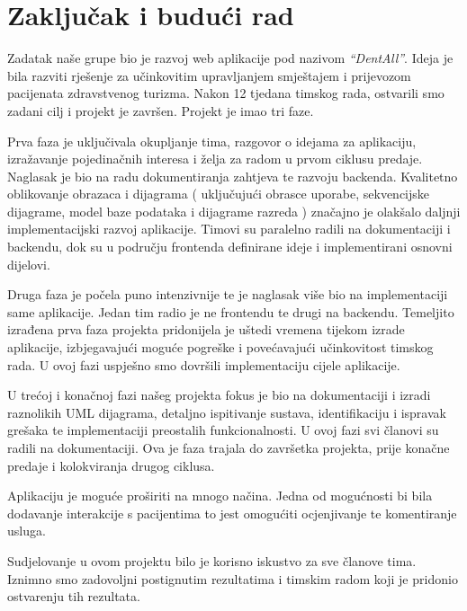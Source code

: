 \chapter{Zaključak i budući rad}
		
		 Zadatak naše grupe bio je razvoj web aplikacije pod nazivom \textit{ “DentAll”}. Ideja je bila razviti rješenje za učinkovitim upravljanjem smještajem i prijevozom pacijenata zdravstvenog turizma. Nakon 12 tjedana timskog rada, ostvarili smo zadani cilj i projekt je završen. Projekt je imao tri faze.
		 
		 Prva faza je uključivala okupljanje tima, razgovor o idejama za aplikaciju, izražavanje pojedinačnih interesa i želja za radom u prvom ciklusu predaje.
		 Naglasak je bio na radu dokumentiranja zahtjeva te razvoju backenda. Kvalitetno oblikovanje obrazaca i dijagrama ( uključujući obrasce uporabe, sekvencijske dijagrame, model baze podataka i dijagrame razreda ) značajno je olakšalo daljnji implementacijski razvoj aplikacije. Timovi su paralelno radili na dokumentaciji i backendu, dok su u području frontenda definirane ideje i implementirani osnovni dijelovi.
		 
		 Druga faza je počela puno intenzivnije te je naglasak više bio na implementaciji same aplikacije. Jedan tim radio je ne frontendu te drugi na backendu. Temeljito izrađena prva faza projekta pridonijela je uštedi vremena tijekom izrade aplikacije, izbjegavajući moguće pogreške i povećavajući učinkovitost timskog rada. U ovoj fazi uspješno smo dovršili implementaciju cijele aplikacije.
		 
		 U trećoj i konačnoj fazi našeg projekta fokus je bio na dokumentaciji i izradi raznolikih UML dijagrama, detaljno ispitivanje sustava, identifikaciju i ispravak grešaka te implementaciji preostalih funkcionalnosti. U ovoj fazi svi članovi su radili na dokumentaciji. Ova je faza trajala do završetka projekta, prije konačne predaje i kolokviranja drugog ciklusa.
		 
		 Aplikaciju je moguće proširiti na mnogo načina. Jedna od mogućnosti bi bila dodavanje interakcije s pacijentima to jest omogućiti ocjenjivanje te komentiranje usluga.
		 
		 Sudjelovanje u ovom projektu bilo je korisno iskustvo za sve članove tima. Iznimno smo zadovoljni postignutim rezultatima i timskim radom koji je pridonio ostvarenju tih rezultata.
		 
		 
		
		\eject 